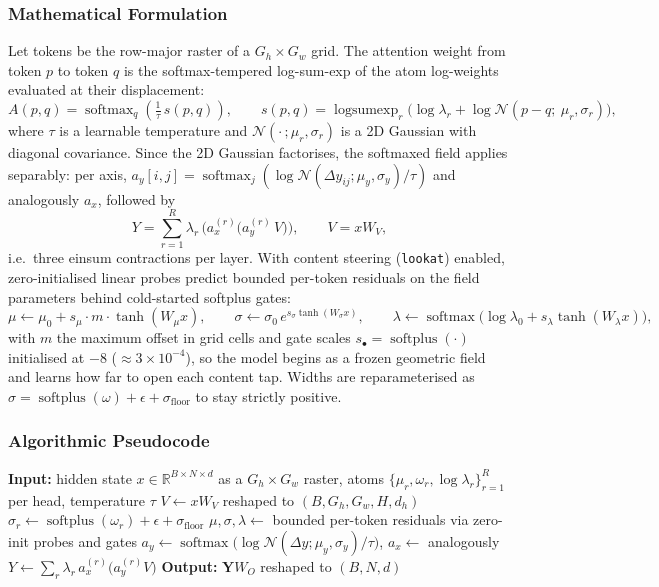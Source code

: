 \subsubsection{Mathematical Formulation}
Let tokens be the row-major raster of a $G_h \times G_w$ grid. The attention weight from token $p$ to token $q$ is the softmax-tempered log-sum-exp of the atom log-weights evaluated at their displacement:
\[
A(p, q) = \operatorname{softmax}_q\!\left( \tfrac{1}{\tau}\, s(p, q) \right),
\qquad
s(p, q) = \operatorname{logsumexp}_r \big( \log \lambda_r + \log \mathcal{N}(p - q;\ \mu_r, \sigma_r) \big),
\]
where $\tau$ is a learnable temperature and $\mathcal{N}(\cdot\,;\mu_r, \sigma_r)$ is a 2D Gaussian with diagonal covariance. Since the 2D Gaussian factorises, the softmaxed field applies separably: per axis, $a_y[i, j] = \operatorname{softmax}_j(\log \mathcal{N}(\Delta y_{ij}; \mu_y, \sigma_y) / \tau)$ and analogously $a_x$, followed by
\[
Y = \sum_{r=1}^{R} \lambda_r\, \big( a_x^{(r)} \big( a_y^{(r)}\, V \big) \big),
\qquad V = x W_V,
\]
i.e.\ three einsum contractions per layer. With content steering (\texttt{lookat}) enabled, zero-initialised linear probes predict bounded per-token residuals on the field parameters behind cold-started softplus gates:
\[
\mu \leftarrow \mu_0 + s_\mu \cdot m \cdot \tanh(W_\mu x), \qquad
\sigma \leftarrow \sigma_0 \, e^{s_\sigma \tanh(W_\sigma x)}, \qquad
\lambda \leftarrow \operatorname{softmax}\big( \log \lambda_0 + s_\lambda \tanh(W_\lambda x) \big),
\]
with $m$ the maximum offset in grid cells and gate scales $s_\bullet = \operatorname{softplus}(\cdot)$ initialised at $-8$ ($\approx 3 \times 10^{-4}$), so the model begins as a frozen geometric field and learns how far to open each content tap. Widths are reparameterised as $\sigma = \operatorname{softplus}(\omega) + \epsilon + \sigma_{\text{floor}}$ to stay strictly positive.

\subsubsection{Algorithmic Pseudocode}
\begin{algorithmic}[1]
\State \textbf{Input:} hidden state $x \in \mathbb{R}^{B \times N \times d}$ as a $G_h \times G_w$ raster, atoms $\{\mu_r, \omega_r, \log \lambda_r\}_{r=1}^{R}$ per head, temperature $\tau$
\State $V \gets x W_V$ reshaped to $(B, G_h, G_w, H, d_h)$ 
\State $\sigma_r \gets \operatorname{softplus}(\omega_r) + \epsilon + \sigma_{\text{floor}}$ 
    \State $\mu, \sigma, \lambda \gets$ bounded per-token residuals via zero-init probes and gates 
\EndIf
\State $a_y \gets \operatorname{softmax}\!\big(\log \mathcal{N}(\Delta y; \mu_y, \sigma_y) / \tau\big)$, \quad $a_x \gets$ analogously 
\State $Y \gets \sum_r \lambda_r\, a_x^{(r)} \big( a_y^{(r)} V \big)$ 
\State \textbf{Output:} $\mathbf{Y} W_O$ reshaped to $(B, N, d)$
\end{algorithmic}

